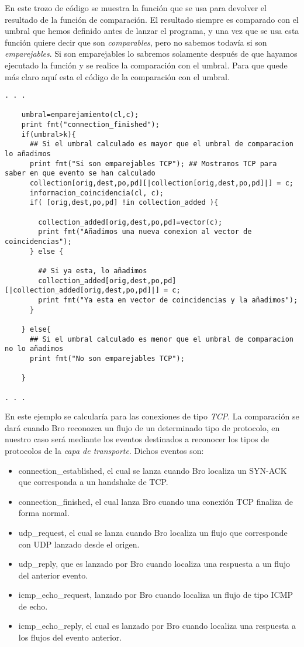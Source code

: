 En este trozo de código se muestra la función que se usa para devolver 
el resultado de la función de comparación. El resultado siempre es comparado 
con el umbral que hemos definido antes de lanzar el programa, y una vez que se 
usa esta función quiere decir que son \textit{comparables}, pero no sabemos todavía si son 
\textit{emparejables}. Si son emparejables lo sabremos solamente después de 
que hayamos ejecutado la función y se realice la comparación con el umbral. Para que 
quede más claro aquí esta el código de la comparación con el umbral.

\begin{lstlisting}[style=CodidoC]
. . .

	umbral=emparejamiento(cl,c);
    print fmt("connection_finished");
    if(umbral>k){
      ## Si el umbral calculado es mayor que el umbral de comparacion lo añadimos
      print fmt("Si son emparejables TCP"); ## Mostramos TCP para saber en que evento se han calculado
      collection[orig,dest,po,pd][|collection[orig,dest,po,pd]|] = c;
      informacion_coincidencia(cl, c);
      if( [orig,dest,po,pd] !in collection_added ){

        collection_added[orig,dest,po,pd]=vector(c);
        print fmt("Añadimos una nueva conexion al vector de coincidencias");
      } else {

        ## Si ya esta, lo añadimos
        collection_added[orig,dest,po,pd][|collection_added[orig,dest,po,pd]|] = c;
        print fmt("Ya esta en vector de coincidencias y la añadimos");
      }

    } else{
      ## Si el umbral calculado es menor que el umbral de comparacion no lo añadimos
      print fmt("No son emparejables TCP");

    }
    
. . .
\end{lstlisting}

En este ejemplo se calcularía para las conexiones de tipo \textit{TCP}.
\intro
La comparación se dará cuando Bro reconozca un flujo de un determinado tipo 
de protocolo, en nuestro caso será mediante los eventos destinados a 
reconocer los tipos de protocolos de la \textit{capa de transporte}.
Dichos eventos son:

\begin{itemize}
\item connection\_established, el cual se lanza cuando Bro localiza un SYN-ACK que corresponda a un handshake de TCP.
\item connection\_finished, el cual lanza Bro cuando una conexión TCP finaliza de forma normal. 
\item udp\_request, el cual se lanza cuando Bro localiza un flujo que corresponde con UDP lanzado desde el origen.
\item udp\_reply, que es lanzado por Bro cuando localiza una respuesta a un flujo del anterior evento.
\item icmp\_echo\_request, lanzado por Bro cuando localiza un flujo de tipo ICMP de echo.
\item icmp\_echo\_reply, el cual es lanzado por Bro cuando localiza una respuesta a los flujos del evento anterior.
\end{itemize}

